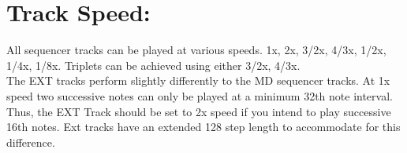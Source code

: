\vspace{-0.3cm}

\section{Track Speed:}
All sequencer tracks can be played at various speeds. 1x, 2x, 3/2x, 4/3x, 1/2x, 1/4x, 1/8x. Triplets can be achieved using either 3/2x, 4/3x.\\

The EXT tracks perform slightly differently to the MD sequencer tracks. At 1x speed two successive notes can only be played at a minimum 32th note interval. Thus, the EXT Track should be set to 2x speed if you intend to play successive 16th notes. Ext tracks have an extended 128 step length to accommodate for this difference.

\vspace{-0.3cm}
